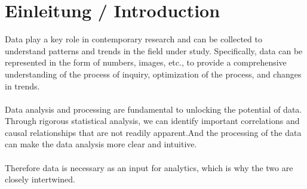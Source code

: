 \documentclass[]{iat}
\begin{document}
	\graphicspath{{./project_graphics/}}


\pagestyle{iat}
\tableofcontents
\chapter{Einleitung / Introduction}
\setcounter{page}{1}
Data play a key role in contemporary research and can be collected to understand patterns and trends in the field under study. Specifically, data can be represented in the form of numbers, images, etc., to provide a comprehensive understanding of the process of inquiry, optimization of the process, and changes in trends.\\
\\
Data analysis and processing are fundamental to unlocking the potential of data. Through rigorous statistical analysis, we can identify important correlations and causal relationships that are not readily apparent.And the processing of the data can make the data analysis more clear and intuitive.\\
\\
Therefore data is necessary as an input for analytics, which is why the two are closely intertwined.
\end{document}
